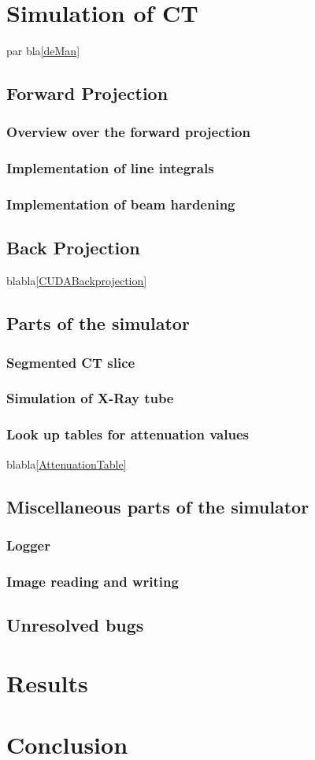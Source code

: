 \chapter{Simulation of CT}
par bla\ref{deMan}
\section{Forward Projection}
\subsection{Overview over the forward projection}
\subsection{Implementation of line integrals}
\subsection{Implementation of beam hardening}
\section{Back Projection}
blabla\ref{CUDABackprojection}
\section{Parts of the simulator}
\subsection{Segmented CT slice}
\subsection{Simulation of X-Ray tube}
\subsection{Look up tables for attenuation values}
blabla\ref{AttenuationTable}
\section{Miscellaneous parts of the simulator}
\subsection{Logger}
\subsection{Image reading and writing}
\section{Unresolved bugs}

\chapter{Results}

\chapter{Conclusion}